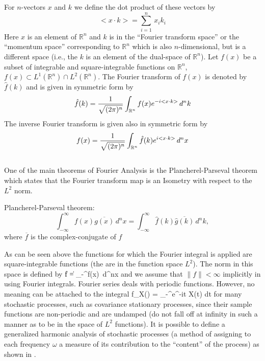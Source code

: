 For $n$-vectors $x$ and $k$ we define the dot product of these vectors by 
$$<x\cdot k> = \sum_{i=1}^n\, x_ik_i$$ Here $x$ is an element of $\mathbb{R}^n$ and $k$ is in the ``Fourier transform space'' or the ``momentum space'' corresponding to $\mathbb{R}^n$ which is also $n$-dimensional, but is a different space (i.e., the $k$ is an element of the dual-space of $\mathbb{R}^n$).
Let $f(x)$ be a subset of integrable and square-integrable functions on $\mathbb{R}^n$, $f(x) \subset L^1(\mathbb{R}^n) \cap L^2(\mathbb{R}^n)$. The Fourier transform of $f(x)$ is denoted by $\hat{f}(k)$ and is given in symmetric form by 
\begin{equation}\hat{f}(k)  = {1\over\sqrt{(2\pi)^n}}\int_{\mathbb{R}^n} f(x) e^{-i <x\cdot k>}\,d^nk\label{eqn:Fourier}\end{equation} The inverse Fourier transform is given also in symmetric form by 
\begin{equation}f(x)  = {1\over\sqrt{(2\pi)^n}}\int_{\mathbb{R}^n} \hat{f}(k) e^{ i <x\cdot k>}\,d^nx\label{eqn:InvFourier}\end{equation} \\
One of the main theorems of Fourier Analysis is the Plancherel-Parseval theorem which states that the Fourier transform map is an {\elevenit Isometry}\/ with respect to the $L^2$ norm. 
\begin{theorem}{Plancherel-Parseval theorem:}
\begin{equation}\int_{-\infty}^\infty  f(x)\overline{g(x)}\, d^nx  = \int_{-\infty}^\infty \hat{f}(k)\overline{\hat{g}(k)}\, d^nk,\label{eqn:Plancherel}\end{equation}
where $\overline{f}$ is the complex-conjugate of $f$
\end{theorem}

As can be seen above the functions for which the Fourier integral is applied are square-integrable functions (the are in the function space $L^2$). The norm in this space is defined by 
\be  \| f \| =  \int_{-\infty}^\infty  f(x)\, d^nx \ee and we assume that $\| f \| < \infty$ implicitly in using Fourier integrals. Fourier series deals with periodic functions. However, no meaning can be attached to the integral 
\be f_X(\omega) = \int_{-\infty}^\infty e^{-it\omega} X(t) dt \ee
for many stochastic processes, such as covariance stationary processes, since their sample functions are non-periodic and are undamped (do not fall off at infinity in such a manner as to be in the space of $L^2$ functions). It is possible to define a generalized harmonic analysis of stochastic processes (a method of assigning to each frequency $\omega$ a measure of its contribution to the ``content'' of the process) as shown in \cite{Wiener3}.

